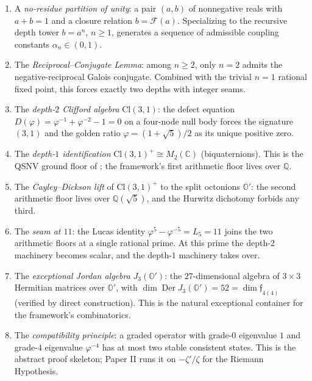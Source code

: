 \documentclass[11pt,a4paper]{article}
\theoremstyle{plain}
\theoremstyle{definition}
\theoremstyle{remark}
\numberwithin{equation}{section}
\providecommand{\Cl}{\mathrm{Cl}}
\providecommand{\C}{\mathbb{C}}
\providecommand{\Q}{\mathbb{Q}}
\providecommand{\Os}{\mathbb{O}'}
\providecommand{\vp}{\varphi}
\providecommand{\Lk}{L}
\providecommand{\fk}[1]{\mathfrak{#1}}
\DeclareMathOperator{\Der}{Der}
\begin{document}
\begin{enumerate}[label=(\arabic*)]
\item A \emph{no-residue partition of unity}: a pair $(a,b)$ of
  nonnegative reals with $a + b = 1$ and a closure relation
  $b = \mathcal{F}(a)$.  Specializing to the recursive depth tower
  $b = a^n$, $n \ge 1$, generates a sequence of admissible coupling
  constants $\alpha_n \in (0, 1)$.

\item The \emph{Reciprocal--Conjugate Lemma}: among $n \ge 2$, only
  $n = 2$ admits the negative-reciprocal Galois conjugate.
  Combined with the trivial $n = 1$ rational fixed point, this
  forces exactly two depths with integer seams.

\item The \emph{depth-$2$ Clifford algebra} $\Cl(3,1)$: the
  defect equation $D(\vp) = \vp^{-1} + \vp^{-2} - 1 = 0$ on a
  four-node null body forces the signature $(3,1)$ and the golden
  ratio $\vp = (1 + \sqrt 5)/2$ as its unique positive zero.

\item The \emph{depth-$1$ identification} $\Cl(3,1)^+ \cong M_2(\C)$
  (biquaternions).  This is the QSNV ground floor of
  \cite{golden-tetrad,sobczyk-qsnv}; the framework's first
  arithmetic floor lives over $\Q$.

\item The \emph{Cayley--Dickson lift} of $\Cl(3,1)^+$ to the split
  octonions $\Os$: the second arithmetic floor lives over
  $\Q(\sqrt 5)$, and the Hurwitz dichotomy forbids any third.

\item The \emph{seam at $11$}: the Lucas identity
  $\vp^5 - \vp^{-5} = \Lk_5 = 11$ joins the two arithmetic floors
  at a single rational prime.  At this prime the depth-$2$
  machinery becomes scalar, and the depth-$1$ machinery takes over.

\item The \emph{exceptional Jordan algebra} $J_3(\Os)$: the
  $27$-dimensional algebra of $3{\times}3$ Hermitian matrices over
  $\Os$, with $\dim\Der J_3(\Os) = 52 = \dim\fk{f}_{4(4)}$
  (verified by direct construction).  This is the natural
  exceptional container for the framework's combinatorics.

\item The \emph{compatibility principle}: a graded operator with
  grade-$0$ eigenvalue $1$ and grade-$4$ eigenvalue $\vp^{-4}$ has
  at most two stable consistent states.  This is the abstract
  proof skeleton; Paper II runs it on $-\zeta'/\zeta$ for the
  Riemann Hypothesis.
\end{enumerate}
\end{document}
